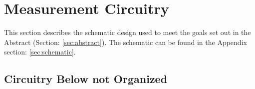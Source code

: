 \section {Measurement Circuitry}
This section describes the schematic design used to meet the goals set out in the Abstract (Section: \ref{sec:abstract}). The schematic can be found in the Appendix section: \ref{sec:schematic}.

\nocite{steve_thesis}
\nocite{my_ieeePaper}






\subsection{Circuitry Below not Organized}

